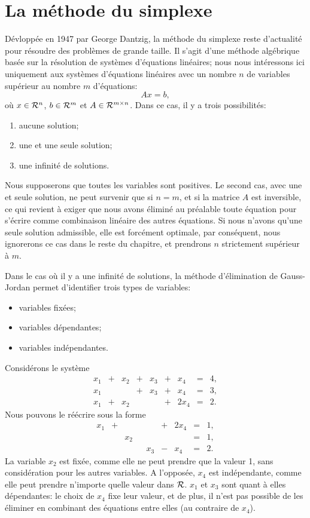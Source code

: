 \section{La méthode du simplexe}

Dévloppée en 1947 par George Dantzig, la méthode du simplexe reste d'actualité pour résoudre des problèmes de grande taille.
Il s'agit d'une méthode algébrique basée sur la résolution de systèmes d'équations linéaires; nous nous intéressons ici uniquement aux systèmes d'équations linéaires avec un nombre $n$ de variables supérieur au nombre $m$ d'équations:
\[
Ax = b,
\]
où $x \in \mathcal{R}^n$, $b \in \mathcal{R}^m$ et $A \in \mathcal{R}^{m \times n}$.
Dans ce cas, il y a trois possibilités:
\begin{enumerate}
\item
aucune solution;
\item
une et une seule solution;
\item
une infinité de solutions.
\end{enumerate}
Nous supposerons que toutes les variables sont positives.
Le second cas, avec une et seule solution, ne peut survenir que si $n = m$, et si la matrice $A$ est inversible, ce qui revient à exiger que nous avons éliminé au préalable toute équation pour s'écrire comme combinaison linéaire des autres équations.
Si nous n'avons qu'une seule solution admissible, elle est forcément optimale, par conséquent, nous ignorerons ce cas dans le reste du chapitre, et prendrons $n$ strictement supérieur à $m$.

Dans le cas où il y a une infinité de solutions, la méthode d'élimination de Gauss-Jordan permet d'identifier trois types de variables:
\begin{itemize}
\item
variables fixées;
\item
variables dépendantes;
\item
variables indépendantes.
\end{itemize}
\begin{example}
Considérons le système
\[
\begin{matrix}
x_1 & + & x_2 & + & x_3 & + & x_4 & = & 4, \\
x_1 & & & + & x_3 & + & x_4 & = & 3, \\
x_1 & + & x_2 & & & + & 2x_4 & = & 2.
\end{matrix}
\]
Nous pouvons le réécrire sous la forme
\[
\begin{matrix}
x_1 & + & & & & + & 2x_4 & = & 1, \\
& & x_2 & & & & & = & 1, \\
& & & & x_3 & - & x_4 & = & 2.
\end{matrix}
\]
La variable $x_2$ est fixée, comme elle ne peut prendre que la valeur 1, sans considération pour les autres variables. A l'opposée, $x_4$ est indépendante, comme elle peut prendre n'importe quelle valeur dans $\mathcal{R}$. $x_1$ et $x_3$ sont quant à elles dépendantes: le choix de $x_4$ fixe leur valeur, et de plus, il n'est pas possible de les éliminer en combinant des équations entre elles (au contraire de $x_4$).
\end{example}

